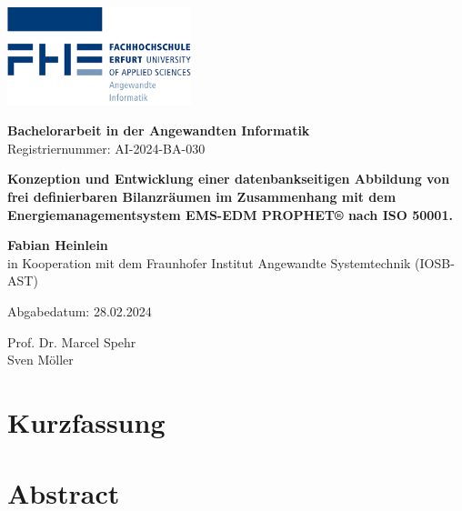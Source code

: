 \documentclass[a4paper,10pt,twoside]{report}
\begin{document}
\begin{titlepage}
  \hspace*{\fill}
  \includegraphics[width=0.4\textwidth,keepaspectratio]{../../Ressourcen/Bilder/FHE-AI_Logo.png}

  \centering
  \vspace*{1cm}

  \vspace{0.5cm}

  {\Huge\textbf{Bachelorarbeit in der Angewandten Informatik}}
  \\
  Registriernummer: AI-2024-BA-030

  \vspace{1.5cm}

  {\large\textbf{Konzeption und Entwicklung einer datenbankseitigen Abbildung von frei definierbaren Bilanzräumen
      im Zusammenhang mit dem Energiemanagementsystem EMS-EDM PROPHET® nach ISO 50001.}}

  \vspace{1.5cm}

  {\Large\textbf{Fabian Heinlein}}
  \\ in Kooperation mit dem Fraunhofer Institut Angewandte Systemtechnik (IOSB-AST)

  \vspace{1cm}

  \Large Abgabedatum: 28.02.2024

  \vspace{1cm}

  Prof. Dr. Marcel Spehr \\
  Sven Möller

  \vfill

\end{titlepage}

\setcounter{page}{1}



\chapter*{Kurzfassung}
\chapter*{Abstract}
\end{document}
